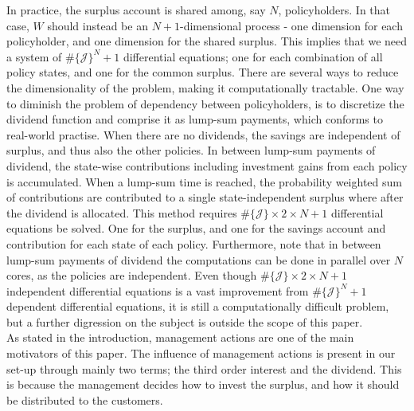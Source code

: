 \documentclass[12pt]{article}
\theoremstyle{my_thm}
\begin{document}
In practice, the surplus account is shared among, say $N$, policyholders. In that case, $W$ should instead be an $N+1$-dimensional process - one dimension for each policyholder, and one dimension for the shared surplus. This implies that we need a system of $\# \{ \mathcal{J} \}^N+1$ differential equations; one for each combination of all policy states, and one for the common surplus. There are several ways to reduce the dimensionality of the problem, making it computationally tractable. One way to diminish the problem of dependency between policyholders, is to discretize the dividend function and comprise it as lump-sum payments, which conforms to real-world practise. When there are no dividends, the savings are independent of surplus, and thus also the other policies. In between lump-sum payments of dividend, the state-wise contributions including investment gains from each policy is accumulated. When a lump-sum time is reached, the probability weighted sum of contributions are contributed to a single state-independent surplus where after the dividend is allocated. This method requires $\# \{ \mathcal{J} \} \times 2 \times N + 1$ differential equations be solved. One for the surplus, and one for the savings account and contribution for each state of each policy. Furthermore, note that in between lump-sum payments of dividend the computations can be done in parallel over $N$ cores, as the policies are independent. Even though $\# \{ \mathcal{J} \} \times 2 \times N + 1$ independent differential equations is a vast improvement from $\# \{ \mathcal{J} \}^N + 1$ dependent differential equations, it is still a computationally difficult problem, but a further digression on the subject is outside the scope of this paper.
\\[12pt]
As stated in the introduction, management actions are one of the main motivators of this paper. The influence of management actions is present in our set-up through mainly two terms; the third order interest and the dividend. This is because the management decides how to invest the surplus, and how it should be distributed to the customers.
\end{document}
